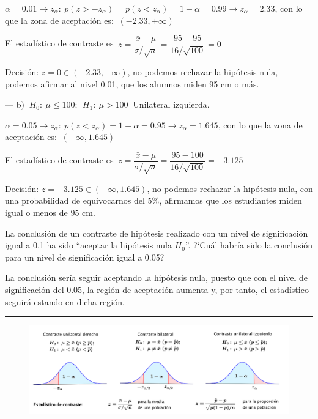$\alpha=0.01 \to z_\alpha :\ p(z>-z_\alpha)=p(z<z_\alpha)=1-\alpha=0.99 \to z_\alpha=2.33$, con lo que la zona de aceptación es: $\ (-2.33,+\infty)$

El estadístico de contraste es $\ z=\dfrac{\bar x - \mu}{\sigma/\sqrt{n}}=\dfrac{95-95}{16/\sqrt{100}}=0$

Decisión: $z=0\in (-2.33,+\infty)$, no podemos rechazar la hipótesis nula, podemos afirmar al nivel 0.01, que los alumnos miden 95 cm o más.

--- b)  $\ H_0 : \ \mu \le 100 ; \ \ H_1: \ \mu > 100 \ $ Unilateral izquierda.

$\alpha=0.05 \to z_\alpha :\ p(z<z_\alpha)=1-\alpha=0.95 \to z_\alpha=1.645$, con lo que la zona de aceptación es: $\ (-\infty,1.645)$

El estadístico de contraste es $\ z=\dfrac{\bar x - \mu}{\sigma/\sqrt{n}}=\dfrac{95-100}{16/\sqrt{100}}=-3.125$

Decisión: $z=-3.125\in (-\infty,1.645)$, no podemos rechazar la hipótesis nula, con una probabilidad de equivocarnos del 5\%, afirmamos que los estudiantes miden igual o menos de 95 cm.


\vspace{4mm}
\begin{ejemplo}
\begin{ejer}
	La conclusión de un contraste de hipótesis realizado con un nivel de significación igual a 0.1 ha sido ``aceptar la hipótesis nula $H_0$''. ?`Cuál habría sido la conclusión para un nivel de significación igual a 0.05?
\end{ejer}
\end{ejemplo}

La conclusión sería seguir aceptando la hipótesis nula, puesto que con el nivel de significación del 0.05, la región de aceptación aumenta y, por tanto, el estadístico seguirá estando en dicha región.

\rule{300pt}{0.1pt}

\begin{figure}[H]
	\centering
	\includegraphics[width=1\textwidth]{imagenes/imagenes06/T06IM07.png}
	\end{figure}	

